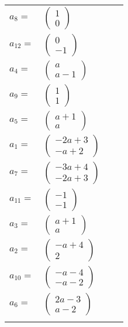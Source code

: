 \documentclass[1p]{elsarticle_modified}
\theoremstyle{definition}
\begin{document}
\begin{tabular}{m{7pt} m{180pt} m{7pt} m{180pt} }
\flushright $a_{8}=$&$\begin{pmatrix}1\\0\end{pmatrix}$ \\
\flushright $a_{12}=$&$\begin{pmatrix}0\\-1\end{pmatrix}$ \\
\flushright $a_{4}=$&$\begin{pmatrix}a\\a-1\end{pmatrix}$ \\
\flushright $a_{9}=$&$\begin{pmatrix}1\\1\end{pmatrix}$ \\
\flushright $a_{5}=$&$\begin{pmatrix}a+1\\a\end{pmatrix}$ \\
\flushright $a_{1}=$&$\begin{pmatrix}-2 a+3\\- a+2\end{pmatrix}$ \\
\flushright $a_{7}=$&$\begin{pmatrix}-3 a+4\\-2 a+3\end{pmatrix}$ \\
\flushright $a_{11}=$&$\begin{pmatrix}-1\\-1\end{pmatrix}$ \\
\flushright $a_{3}=$&$\begin{pmatrix}a+1\\a\end{pmatrix}$ \\
\flushright $a_{2}=$&$\begin{pmatrix}- a+4\\2\end{pmatrix}$ \\
\flushright $a_{10}=$&$\begin{pmatrix}- a-4\\- a-2\end{pmatrix}$ \\
\flushright $a_{6}=$&$\begin{pmatrix}2 a-3\\a-2\end{pmatrix}$\\&\end{tabular}
\end{document}
